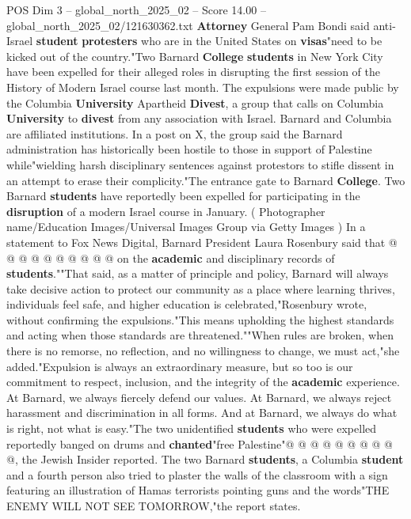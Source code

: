 \begin{textsample}{POS Dim 3 – global\_north\_2025\_02 – Score 14.00 – global\_north\_2025\_02/121630362.txt}  \label{ex:f3_pos_288}
\textbf{Attorney} General Pam Bondi said anti-Israel \textbf{student} \textbf{protesters} who are in the United States on \textbf{visas}"need to be kicked out of the country."Two Barnard \textbf{College} \textbf{students} in New York City have been expelled for their alleged roles in disrupting the first session of the History of Modern Israel course last month.
The expulsions were made public by the Columbia \textbf{University} Apartheid \textbf{Divest}, a group that calls on Columbia \textbf{University} to \textbf{divest} from any association with Israel.
Barnard and Columbia are affiliated institutions.
In a post on X, the group said the Barnard administration has historically been hostile to those in support of Palestine while"wielding harsh disciplinary sentences against protestors to stifle dissent in an attempt to erase their complicity."The entrance gate to Barnard \textbf{College}.
Two Barnard \textbf{students} have reportedly been expelled for participating in the \textbf{disruption} of a modern Israel course in January. ( Photographer name/Education Images/Universal Images Group via Getty Images ) In a statement to Fox News Digital, Barnard President Laura Rosenbury said that @ @ @ @ @ @ @ @ @ @ on the \textbf{academic} and disciplinary records of \textbf{students}.""That said, as a matter of principle and policy, Barnard will always take decisive action to protect our community as a place where learning thrives, individuals feel safe, and higher education is celebrated,"Rosenbury wrote, without confirming the expulsions."This means upholding the highest standards and acting when those standards are threatened.""When rules are broken, when there is no remorse, no reflection, and no willingness to change, we must act,"she added."Expulsion is always an extraordinary measure, but so too is our commitment to respect, inclusion, and the integrity of the \textbf{academic} experience.
At Barnard, we always fiercely defend our values.
At Barnard, we always reject harassment and discrimination in all forms.
And at Barnard, we always do what is right, not what is easy."The two unidentified \textbf{students} who were expelled reportedly banged on drums and \textbf{chanted}"free Palestine"@ @ @ @ @ @ @ @ @ @, the Jewish Insider reported.
The two Barnard \textbf{students}, a Columbia \textbf{student} and a fourth person also tried to plaster the walls of the classroom with a sign featuring an illustration of Hamas terrorists pointing guns and the words"THE ENEMY WILL NOT SEE TOMORROW,"the report states.

\end{textsample}
